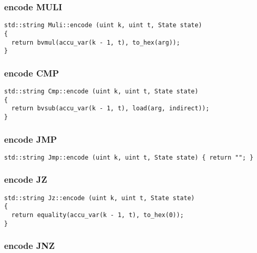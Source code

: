 \subsubsection{encode MULI}

\begin{lstlisting}[style=c++]
std::string Muli::encode (uint k, uint t, State state)
{
  return bvmul(accu_var(k - 1, t), to_hex(arg));
}
\end{lstlisting}

\subsubsection{encode CMP}

\begin{lstlisting}[style=c++]
std::string Cmp::encode (uint k, uint t, State state)
{
  return bvsub(accu_var(k - 1, t), load(arg, indirect));
}
\end{lstlisting}

\subsubsection{encode JMP}

\begin{lstlisting}[style=c++]
std::string Jmp::encode (uint k, uint t, State state) { return ""; }
\end{lstlisting}

\subsubsection{encode JZ}

\begin{lstlisting}[style=c++]
std::string Jz::encode (uint k, uint t, State state)
{
  return equality(accu_var(k - 1, t), to_hex(0));
}
\end{lstlisting}

\subsubsection{encode JNZ}

